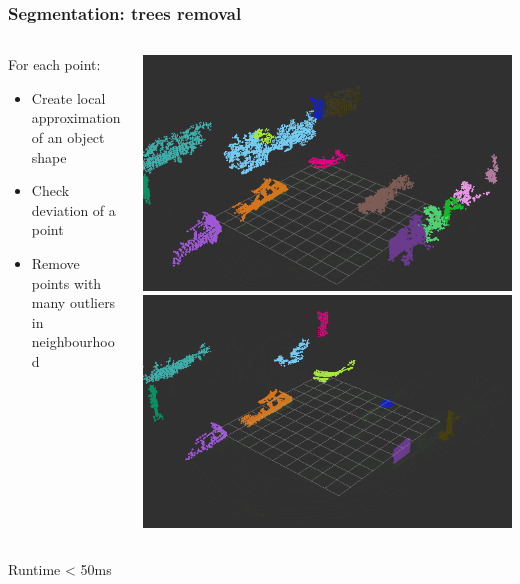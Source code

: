\documentclass[xcolor=table,usenames,dvipsnames]{beamer}
\begin{document}
\begin{frame}
\frametitle{Segmentation: trees removal}
\begin{columns}
\begin{column}{0.4\textwidth}
For each point:
\begin{itemize}
\item Create local approximation of an object shape
\item Check deviation of a point
\item Remove points with many outliers in neighbourhood
\end{itemize}
\end{column}
\begin{column}{0.6\textwidth}
\includegraphics[height=0.4\textheight]{img/before_plants_removal.png}
\includegraphics[height=0.4\textheight]{img/plants_removal.png}
\end{column}
\end{columns}
Runtime < 50ms
\end{frame}
\end{document}
